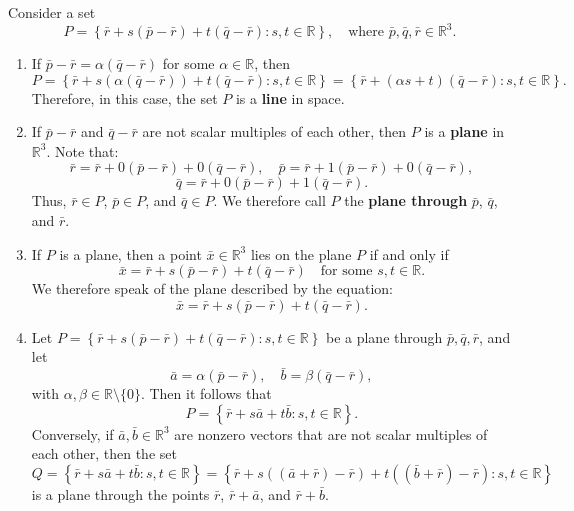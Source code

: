 \begin{remarkbox}

Consider a set
\[
P = \left\{ \bar{r} + s(\bar{p} - \bar{r}) + t(\bar{q} - \bar{r}) : s, t \in \mathbb{R} \right\}, \quad \text{where } \bar{p}, \bar{q}, \bar{r} \in \mathbb{R}^3.
\]
\begin{enumerate}
    \item If \( \bar{p} - \bar{r} = \alpha(\bar{q} - \bar{r}) \) for some \( \alpha \in \mathbb{R} \), then
    \[
    P = \left\{ \bar{r} + s\left( \alpha(\bar{q} - \bar{r}) \right) + t(\bar{q} - \bar{r}) : s, t \in \mathbb{R} \right\}
      = \left\{ \bar{r} + (\alpha s + t)(\bar{q} - \bar{r}) : s, t \in \mathbb{R} \right\}.
    \]
    Therefore, in this case, the set \( P \) is a \textbf{line} in space.

    \item If \( \bar{p} - \bar{r} \) and \( \bar{q} - \bar{r} \) are not scalar multiples of each other, then \( P \) is a \textbf{plane} in \( \mathbb{R}^3 \). Note that:
    \[
    \bar{r} = \bar{r} + 0(\bar{p} - \bar{r}) + 0(\bar{q} - \bar{r}), \quad
    \bar{p} = \bar{r} + 1(\bar{p} - \bar{r}) + 0(\bar{q} - \bar{r}),
    \]
    \[
    \bar{q} = \bar{r} + 0(\bar{p} - \bar{r}) + 1(\bar{q} - \bar{r}).
    \]
    Thus, \( \bar{r} \in P \), \( \bar{p} \in P \), and \( \bar{q} \in P \). We therefore call \( P \) the \textbf{plane through} \( \bar{p} \), \( \bar{q} \), and \( \bar{r} \).

    \item If \( P \) is a plane, then a point \( \bar{x} \in \mathbb{R}^3 \) lies on the plane \( P \) if and only if
    \[
    \bar{x} = \bar{r} + s(\bar{p} - \bar{r}) + t(\bar{q} - \bar{r}) \quad \text{for some } s, t \in \mathbb{R}.
    \]
    We therefore speak of the plane described by the equation:
    \[
    \bar{x} = \bar{r} + s(\bar{p} - \bar{r}) + t(\bar{q} - \bar{r}).
    \]

    \item Let \( P = \left\{ \bar{r} + s(\bar{p} - \bar{r}) + t(\bar{q} - \bar{r}) : s, t \in \mathbb{R} \right\} \) be a plane through \( \bar{p}, \bar{q}, \bar{r} \), and let
    \[
    \bar{a} = \alpha(\bar{p} - \bar{r}), \quad \bar{b} = \beta(\bar{q} - \bar{r}),
    \]
    with \( \alpha, \beta \in \mathbb{R} \setminus \{0\} \). Then it follows that
    \[
    P = \left\{ \bar{r} + s\bar{a} + t\bar{b} : s, t \in \mathbb{R} \right\}.
    \]
    Conversely, if \( \bar{a}, \bar{b} \in \mathbb{R}^3 \) are nonzero vectors that are not scalar multiples of each other, then the set
    \[
    Q = \left\{ \bar{r} + s\bar{a} + t\bar{b} : s, t \in \mathbb{R} \right\}
    = \left\{ \bar{r} + s\left( (\bar{a} + \bar{r}) - \bar{r} \right) + t\left( (\bar{b} + \bar{r}) - \bar{r} \right) : s, t \in \mathbb{R} \right\}
    \]
    is a plane through the points \( \bar{r} \), \( \bar{r} + \bar{a} \), and \( \bar{r} + \bar{b} \).
\end{enumerate}
\end{remarkbox}

